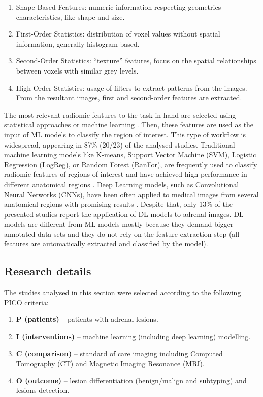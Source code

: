 \documentclass[11pt]{article}
\begin{document}
\begin{enumerate}
    \item Shape-Based Features: numeric information respecting geometrics characteristics, like shape and size.
    \item First-Order Statistics: distribution of voxel values without spatial information, generally histogram-based.
    \item Second-Order Statistics: “texture” features, focus on the spatial relationships between voxels with similar grey levels.
    \item High-Order Statistics: usage of filters to extract patterns from the images. From the resultant images, first and second-order features are extracted.
\end{enumerate}

The most relevant radiomic features to the task in hand are selected using
statistical approaches or machine learning \cite{Zhang2022}. Then, these
features are used as the input of ML models to classify the region of interest.
This type of workflow is widespread, appearing in 87\% (20/23) of the analysed
studies. Traditional machine learning models like K-means, Support Vector
Machine (SVM), Logistic Regression (LogReg), or Random Forest (RanFor), are
frequently used to classify radiomic features of regions of interest and have
achieved high performance in different anatomical regions \cite{Zhang2022,
    Wagner2021}. Deep Learning models, such as Convolutional Neural Networks
(CNNs), have been often applied to medical images from several anatomical
regions with promising results \cite{Anaya-Isaza2021}. Despite that, only 13\%
of the presented studies report the application of DL models to
adrenal images. DL models are different from ML models mostly because they
demand bigger annotated data sets and they do not rely on the feature extraction
step (all features are automatically extracted and classified by the model).

\subsection{Research details}

The studies analysed in this section were selected according to the following PICO criteria:

\begin{enumerate}
    \item[] \textbf{P (patients) }– patients with adrenal lesions.
    \item[] \textbf{I (interventions) }– machine learning (including deep learning) modelling.
    \item[] \textbf{C (comparison) }– standard of care imaging including Computed Tomography (CT) and Magnetic Imaging Resonance (MRI).
    \item[] \textbf{O (outcome) }– lesion differentiation (benign/malign and subtyping) and lesions detection.
\end{enumerate}
\end{document}
